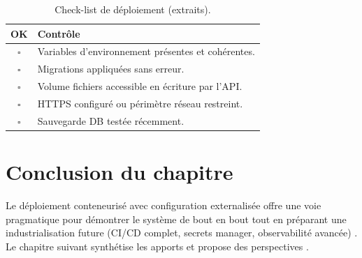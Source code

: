 \begin{table}[htbp]
  \centering
  \caption{Check-list de déploiement (extraits).}
  \label{tab:checklist}
  \begin{tabular}{cp{12cm}}
    \toprule
    \textbf{OK} & \textbf{Contrôle} \\
    \midrule
    $\square$ & Variables d'environnement présentes et cohérentes. \\
    $\square$ & Migrations appliquées sans erreur. \\
    $\square$ & Volume fichiers accessible en écriture par l'API. \\
    $\square$ & HTTPS configuré ou périmètre réseau restreint. \\
    $\square$ & Sauvegarde DB testée récemment. \\
    \bottomrule
  \end{tabular}
\end{table}

\section{Conclusion du chapitre}

Le déploiement conteneurisé avec configuration externalisée offre une voie pragmatique pour démontrer le système de bout en bout tout en préparant une industrialisation future (CI/CD complet, secrets manager, observabilité avancée) \cite{bass2021,dockerdoc}. Le chapitre suivant synthétise les apports et propose des perspectives \cite{kleppmann2017,newman2021}.
